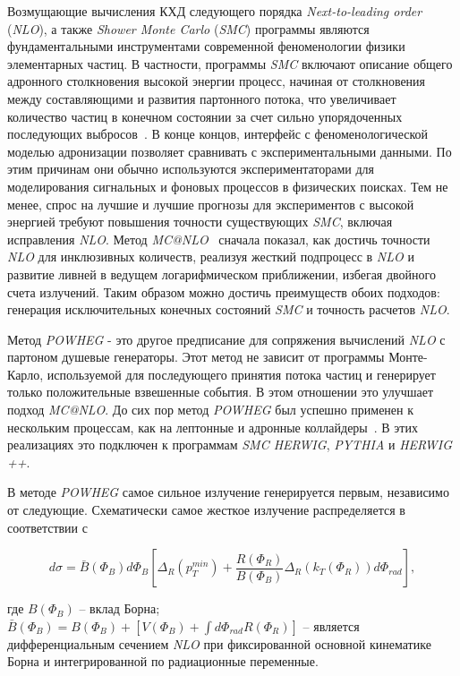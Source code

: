 Возмущающие вычисления КХД следующего порядка \textit{Next-to-leading order} (\textit{NLO}), а также \textit{Shower Monte Carlo}
(\textit{SMC}) программы являются фундаментальными инструментами современной феноменологии физики элементарных частиц. В частности, программы \textit{SMC} включают описание общего адронного столкновения высокой энергии
процесс, начиная от столкновения между составляющими и развития партонного потока, что
увеличивает количество частиц в конечном состоянии за счет сильно упорядоченных последующих выбросов~\cite{review-powheg}.
В конце концов, интерфейс с феноменологической моделью адронизации позволяет сравнивать
с экспериментальными данными. По этим причинам они обычно используются экспериментаторами для
моделирования сигнальных и фоновых процессов в физических поисках. Тем не менее, спрос на
лучшие и лучшие прогнозы для экспериментов с высокой энергией требуют повышения точности
существующих \textit{SMC}, включая исправления \textit{NLO}. Метод \textit{MC@NLO}~\cite{review-powheg} сначала показал, как
достичь точности \textit{NLO} для инклюзивных количеств, реализуя жесткий подпроцесс в \textit{NLO} и
развитие ливней в ведущем логарифмическом приближении, избегая двойного счета
излучений. Таким образом можно достичь преимуществ обоих подходов: генерация исключительных конечных состояний
\textit{SMC} и точность расчетов \textit{NLO}.

Метод \textit{POWHEG} - это другое предписание для сопряжения вычислений \textit{NLO} с партоном
душевые генераторы.
Этот метод не зависит от программы Монте-Карло, используемой для последующего принятия потока частиц и
генерирует только положительные взвешенные события. В этом отношении это улучшает подход \textit{MC@NLO}.
До сих пор метод \textit{POWHEG} был успешно применен к нескольким процессам, как на
лептонные и адронные коллайдеры~\cite{review-powheg}. В этих реализациях это
подключен к программам \textit{SMC HERWIG}, \textit{PYTHIA} и \textit{HERWIG ++}.

В методе \textit{POWHEG} самое сильное излучение
генерируется первым, независимо от
следующие. Схематически
самое жесткое излучение распределяется в соответствии с

\begin{equation} \label{eq:1-1} 
	d\sigma = \bar{B} ({\Phi}_{B}) d{\Phi}_{B}[{\Delta}_{R}({p}_{T}^{min}) + \frac{R({\Phi}_{R})}{B({\Phi}_{B})}{\Delta}_{R}({k}_{T}({\Phi}_{R}))d{\Phi}_{rad}],
\end{equation}

\begin{flushleft}
	где $B({\Phi}_{B})$ -- вклад Борна;\\
	$\bar{B}({\Phi}_{B}) = B({\Phi}_{B}) + [V({\Phi}_{B}) + \int d{\Phi}_{rad}R({\Phi}_{R})]$ -- является дифференциальным сечением \textit{NLO} при фиксированной основной кинематике Борна и интегрированной по
	радиационные переменные.
\end{flushleft}

